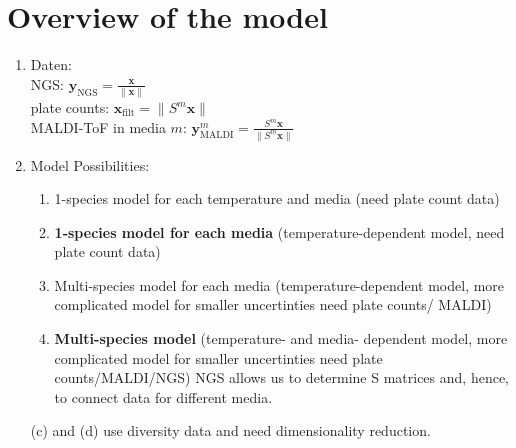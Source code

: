 \documentclass[10pt,A4paper]{article}
\begin{document}
\section{Overview of the model}
\begin{enumerate}
    \item Daten: \\
        NGS:  $ \mathbf{y}_\text{NGS} = \frac{\mathbf{x}}{\lVert \mathbf{x} \rVert}$\\
        plate counts: $ \mathbf{x}_\text{filt} = {\lVert S^m \mathbf{x} \rVert}$\\
        MALDI-ToF in media $m$: $ \mathbf{y}^m_\text{MALDI} = \frac{ S^m \mathbf{x}}{\lVert S^m \mathbf{x} \rVert}$\\
    \item Model Possibilities:
    \begin{enumerate}
        \item 1-species model for each temperature and media (need plate count data)
        \item \textbf{1-species model for each media} (temperature-dependent model, need plate count data)
        \item Multi-species model for each media (temperature-dependent model, more complicated model for smaller uncertinties need plate counts/ MALDI)
        \item \textbf{Multi-species model} (temperature- and media- dependent model, more complicated model for smaller uncertinties need plate counts/MALDI/NGS)
        NGS allows us to determine S matrices and, hence, to connect data for different media.
    \end{enumerate}
    (c) and (d) use diversity data and need dimensionality reduction.


\end{enumerate}
\end{document}
